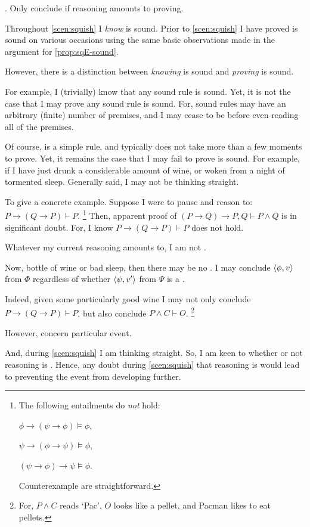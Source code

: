 \begin{note}
  .
  Only conclude if reasoning amounts to proving.

  Throughout \autoref{scen:squish} I \emph{know} \sqE{} is sound.
  Prior to \autoref{scen:squish} I have proved \sqE{} is sound on various occasions using the same basic observations made in the argument for \autoref{prop:sqE-sound}.

  However, there is a distinction between \emph{knowing} \sqE{} is sound and \emph{proving} \sqE{} is sound.

  For example, I (trivially) know that any sound rule is sound.
  Yet, it is not the case that I may prove any sound rule is sound.
  For, sound rules may have an arbitrary (finite) number of premises, and I may cease to be before even reading all of the premises.

  Of course, \sqE{} is a simple rule, and typically does not take more than a few moments to prove.
  Yet, it remains the case that I may fail to prove \sqE{} is sound.
  For example, if I have just drunk a considerable amount of wine, or woken from a night of tormented sleep.
  Generally said, I may not be thinking straight.

  To give a concrete example.
  Suppose I were to pause and reason to:
  \(P \rightarrow (Q \rightarrow P) \vdash P\).%
  \footnote{
    The following entailments do \emph{not} hold:
    \begin{enumerate*}[noitemsep, label=]
    \item
      \(\phi \rightarrow (\psi \rightarrow \phi) \vDash \phi\),
    \item
      \(\psi \rightarrow (\phi \rightarrow \psi) \vDash \phi\),
    \item
      \((\psi \rightarrow \phi) \rightarrow \psi \vDash \phi\).
    \end{enumerate*}
    Counterexample are straightforward.
  }
  Then, apparent proof of \((P \rightarrow Q) \rightarrow P, Q \vdash P \land Q\) is in significant doubt.
  For, I know \(P \rightarrow (Q \rightarrow P) \vdash P\) does not hold.

  Whatever my current reasoning amounts to, I am not \tC{}.
\end{note}

\begin{note}
  Now, bottle of wine or bad sleep, then there may be no .
  I may conclude \(\langle \phi, v \rangle\) from \(\Phi\) regardless of whether \(\langle \psi, v' \rangle\) from \(\Psi\) is a \fc{}.

  Indeed, given some particularly good wine I may not only conclude \(P \rightarrow (Q \rightarrow P) \vdash P\), but also conclude \(P \land C \vdash O\).%
  \footnote{
    For, \(P \land C\) reads `Pac', \(O\) looks like a pellet, and Pacman likes to eat pellets.
  }

  However,  concern particular event.

  And, during \autoref{scen:squish} I am thinking straight.
  So, I am {\color{blue} keen} to whether or not reasoning is .
  Hence, any doubt during \autoref{scen:squish} that reasoning is  would lead to preventing the event from developing further.
\end{note}

